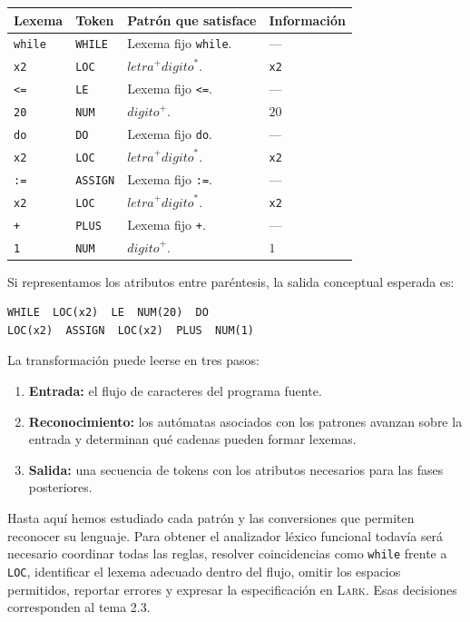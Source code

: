 \documentclass[11pt,spanish]{article}
\providecommand{\tabularnewline}{\\}
\begin{document}
\begin{center}
\renewcommand{\arraystretch}{1.2}
\begin{tabular}{|p{}|p{}|p{}|p{}|}
\hline
\textbf{Lexema} & \textbf{Token} & \textbf{Patrón que satisface} & \textbf{Información} \tabularnewline
\hline
\texttt{while} & \texttt{WHILE} & Lexema fijo \texttt{while}. & --- \tabularnewline
\hline
\texttt{x2} & \texttt{LOC} & \(\mathit{letra}^{+}\mathit{digito}^{*}\). & \texttt{x2} \tabularnewline
\hline
\texttt{<=} & \texttt{LE} & Lexema fijo \texttt{<=}. & --- \tabularnewline
\hline
\texttt{20} & \texttt{NUM} & \(\mathit{digito}^{+}\). & \(20\) \tabularnewline
\hline
\texttt{do} & \texttt{DO} & Lexema fijo \texttt{do}. & --- \tabularnewline
\hline
\texttt{x2} & \texttt{LOC} & \(\mathit{letra}^{+}\mathit{digito}^{*}\). & \texttt{x2} \tabularnewline
\hline
\texttt{:=} & \texttt{ASSIGN} & Lexema fijo \texttt{:=}. & --- \tabularnewline
\hline
\texttt{x2} & \texttt{LOC} & \(\mathit{letra}^{+}\mathit{digito}^{*}\). & \texttt{x2} \tabularnewline
\hline
\texttt{+} & \texttt{PLUS} & Lexema fijo \texttt{+}. & --- \tabularnewline
\hline
\texttt{1} & \texttt{NUM} & \(\mathit{digito}^{+}\). & \(1\) \tabularnewline
\hline
\end{tabular}
\end{center}

Si representamos los atributos entre paréntesis, la salida conceptual esperada es:

\begin{lstlisting}
WHILE  LOC(x2)  LE  NUM(20)  DO
LOC(x2)  ASSIGN  LOC(x2)  PLUS  NUM(1)
\end{lstlisting}

La transformación puede leerse en tres pasos:

\begin{enumerate}[leftmargin=*]
    \item \textbf{Entrada:} el flujo de caracteres del programa fuente.
    \item \textbf{Reconocimiento:} los autómatas asociados con los patrones avanzan sobre la entrada y determinan qué cadenas pueden formar lexemas.
    \item \textbf{Salida:} una secuencia de tokens con los atributos necesarios para las fases posteriores.
\end{enumerate}

Hasta aquí hemos estudiado cada patrón y las conversiones que permiten reconocer su lenguaje. Para obtener el analizador léxico funcional todavía será necesario coordinar todas las reglas, resolver coincidencias como \texttt{while} frente a \texttt{LOC}, identificar el lexema adecuado dentro del flujo, omitir los espacios permitidos, reportar errores y expresar la especificación en \textsc{Lark}. Esas decisiones corresponden al tema 2.3.
\end{document}
